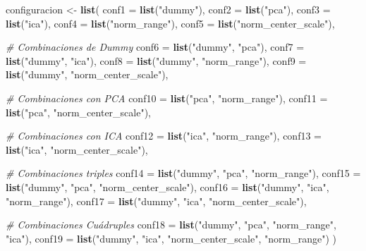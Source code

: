 \documentclass[
]{article}
\newenvironment{Shaded}{\begin{snugshade}}{\end{snugshade}}
\newcommand{\AttributeTok}[1]{\textcolor[rgb]{0.13,0.29,0.53}{#1}}
\newcommand{\CommentTok}[1]{\textcolor[rgb]{0.56,0.35,0.01}{\textit{#1}}}
\newcommand{\FunctionTok}[1]{\textcolor[rgb]{0.13,0.29,0.53}{\textbf{#1}}}
\newcommand{\NormalTok}[1]{#1}
\newcommand{\OtherTok}[1]{\textcolor[rgb]{0.56,0.35,0.01}{#1}}
\newcommand{\StringTok}[1]{\textcolor[rgb]{0.31,0.60,0.02}{#1}}
\begin{document}
\begin{Shaded}
\begin{Highlighting}[]
\NormalTok{configuracion }\OtherTok{\textless{}{-}} \FunctionTok{list}\NormalTok{(}
  \AttributeTok{conf1  =} \FunctionTok{list}\NormalTok{(}\StringTok{"dummy"}\NormalTok{),}
  \AttributeTok{conf2  =} \FunctionTok{list}\NormalTok{(}\StringTok{"pca"}\NormalTok{),}
  \AttributeTok{conf3  =} \FunctionTok{list}\NormalTok{(}\StringTok{"ica"}\NormalTok{),}
  \AttributeTok{conf4  =} \FunctionTok{list}\NormalTok{(}\StringTok{"norm\_range"}\NormalTok{),}
  \AttributeTok{conf5  =} \FunctionTok{list}\NormalTok{(}\StringTok{"norm\_center\_scale"}\NormalTok{),}
  
  \CommentTok{\# Combinaciones de Dummy}
  \AttributeTok{conf6  =} \FunctionTok{list}\NormalTok{(}\StringTok{"dummy"}\NormalTok{, }\StringTok{"pca"}\NormalTok{),}
  \AttributeTok{conf7  =} \FunctionTok{list}\NormalTok{(}\StringTok{"dummy"}\NormalTok{, }\StringTok{"ica"}\NormalTok{),}
  \AttributeTok{conf8  =} \FunctionTok{list}\NormalTok{(}\StringTok{"dummy"}\NormalTok{, }\StringTok{"norm\_range"}\NormalTok{),}
  \AttributeTok{conf9  =} \FunctionTok{list}\NormalTok{(}\StringTok{"dummy"}\NormalTok{, }\StringTok{"norm\_center\_scale"}\NormalTok{),}
  
  \CommentTok{\# Combinaciones con PCA}
  \AttributeTok{conf10 =} \FunctionTok{list}\NormalTok{(}\StringTok{"pca"}\NormalTok{, }\StringTok{"norm\_range"}\NormalTok{),}
  \AttributeTok{conf11 =} \FunctionTok{list}\NormalTok{(}\StringTok{"pca"}\NormalTok{, }\StringTok{"norm\_center\_scale"}\NormalTok{),}
  
  \CommentTok{\# Combinaciones con ICA}
  \AttributeTok{conf12 =} \FunctionTok{list}\NormalTok{(}\StringTok{"ica"}\NormalTok{, }\StringTok{"norm\_range"}\NormalTok{),}
  \AttributeTok{conf13 =} \FunctionTok{list}\NormalTok{(}\StringTok{"ica"}\NormalTok{, }\StringTok{"norm\_center\_scale"}\NormalTok{),}
  
  \CommentTok{\# Combinaciones triples}
  \AttributeTok{conf14 =} \FunctionTok{list}\NormalTok{(}\StringTok{"dummy"}\NormalTok{, }\StringTok{"pca"}\NormalTok{, }\StringTok{"norm\_range"}\NormalTok{),}
  \AttributeTok{conf15 =} \FunctionTok{list}\NormalTok{(}\StringTok{"dummy"}\NormalTok{, }\StringTok{"pca"}\NormalTok{, }\StringTok{"norm\_center\_scale"}\NormalTok{),}
  \AttributeTok{conf16 =} \FunctionTok{list}\NormalTok{(}\StringTok{"dummy"}\NormalTok{, }\StringTok{"ica"}\NormalTok{, }\StringTok{"norm\_range"}\NormalTok{),}
  \AttributeTok{conf17 =} \FunctionTok{list}\NormalTok{(}\StringTok{"dummy"}\NormalTok{, }\StringTok{"ica"}\NormalTok{, }\StringTok{"norm\_center\_scale"}\NormalTok{),}
  
  \CommentTok{\# Combinaciones Cuádruples}
  \AttributeTok{conf18 =} \FunctionTok{list}\NormalTok{(}\StringTok{"dummy"}\NormalTok{, }\StringTok{"pca"}\NormalTok{, }\StringTok{"norm\_range"}\NormalTok{, }\StringTok{"ica"}\NormalTok{),}
  \AttributeTok{conf19 =} \FunctionTok{list}\NormalTok{(}\StringTok{"dummy"}\NormalTok{, }\StringTok{"ica"}\NormalTok{, }\StringTok{"norm\_center\_scale"}\NormalTok{, }\StringTok{"norm\_range"}\NormalTok{)}
\NormalTok{)}
\end{Highlighting}
\end{Shaded}
\end{document}

